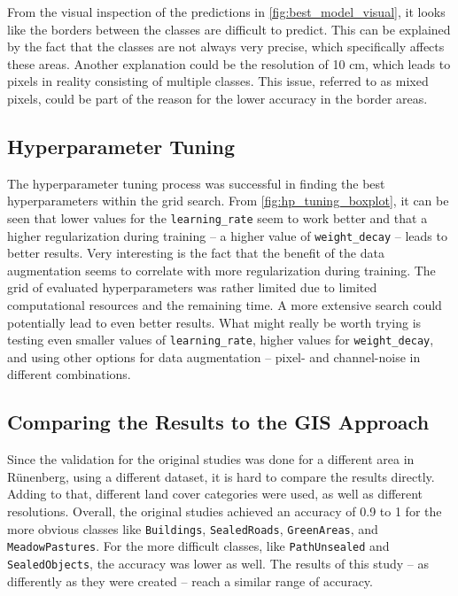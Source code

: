 From the visual inspection of the predictions in \autoref{fig:best_model_visual},
it looks like the borders between the classes are difficult to predict. This can be
explained by the fact that the classes are not always very precise, which specifically
affects these areas. Another explanation could be the resolution of 10 cm,
which leads to pixels in reality consisting of multiple classes. This issue, referred to
as mixed pixels, could be part of the reason for the lower accuracy in the
border areas.

\subsection{Hyperparameter Tuning}

The hyperparameter tuning process was successful in finding the best hyperparameters
within the grid search. From \autoref{fig:hp_tuning_boxplot}, it can be seen that
lower values for the \texttt{learning\_rate} seem to work better and that
a higher regularization during training -- a higher value of \texttt{weight\_decay} -- leads to
better results. Very interesting is the fact that the benefit of the data augmentation
seems to correlate with more regularization during training.
The grid of evaluated hyperparameters was rather limited due to limited computational
resources and the remaining time. A more extensive search could potentially lead to
even better results. What might really be worth trying is testing even smaller
values of \texttt{learning\_rate}, higher values for \texttt{weight\_decay}, 
and using other options for data augmentation --
pixel- and channel-noise in different combinations.

\subsection{Comparing the Results to the GIS Approach}

Since the validation for the original studies was done for a different area in Rünenberg,
using a different dataset, it is hard to compare the results directly. Adding to that,
different land cover categories were used, as well as different resolutions. Overall, the
original studies achieved an accuracy of 0.9 to 1 for the more obvious classes like
\texttt{Buildings}, \texttt{SealedRoads}, \texttt{GreenAreas}, and \texttt{MeadowPastures}. 
For the more difficult classes, like \texttt{PathUnsealed} and \texttt{SealedObjects}, the
accuracy was lower as well. The results of this study -- as differently as they were created --
reach a similar range of accuracy.

